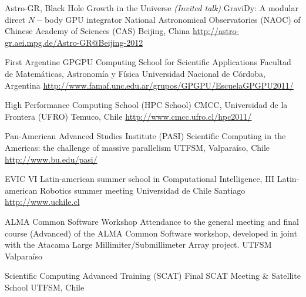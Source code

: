 \documentclass[11pt,a4paper]{moderncv}
\newcommand{\gray}{\textcolor{gray}}
\newcommand{\myurl}[1]{\gray{\url{#1}}}
\begin{document}
        {Astro-GR, Black Hole Growth in the Universe \emph{(Invited talk)}}
        {GraviDy: A modular direct $N-$body GPU integrator}
        {National Astronomical Observatories (NAOC) of Chinese Academy of Sciences
        (CAS)}
        {Beijing, China}
        {\myurl{http://astro-gr.aei.mpg.de/Astro-GR@Beijing-2012}}

        {First Argentine GPGPU Computing School for Scientific Applications}
        {Facultad de Matemáticas, Astronomía y Física}
        {Universidad Nacional de Córdoba, Argentina}
        {\myurl{http://www.famaf.unc.edu.ar/grupos/GPGPU/EscuelaGPGPU2011/}}
        {}

        {High Performance Computing School}
        {(HPC School)}
        {CMCC, Universidad de la Frontera (UFRO)}
        {Temuco, Chile}
        {\myurl{http://www.cmcc.ufro.cl/hpc2011/}}

        {Pan-American Advanced Studies Institute}
        {(PASI)}
        {Scientific Computing in the Americas: the challenge of massive parallelism}
        {UTFSM, Valparaíso, Chile}
        {\myurl{http://www.bu.edu/pasi/}}

        {EVIC}
        {VI Latin-american summer school in Computational Intelligence, %
         III Latin-american Robotics summer meeting}
        {Universidad de Chile}
        {Santiago}
        {\myurl{http://www.uchile.cl}}

        {ALMA Common Software Workshop}
        {Attendance to the general meeting and final course (Advanced) of the ALMA
        Common Software workshop, developed in joint with the Atacama Large
        Millimiter/Submillimeter Array project.}
        {UTFSM}
        {Valparaíso}
        {}

        {Scientific Computing Advanced Training}
        {(SCAT)}
        {Final SCAT Meeting \& Satellite School}
        {UTFSM, Chile}
        {}

\renewcommand*{\listitemsymbol}{\hspace{2em}\labelitemi~}
\end{document}
